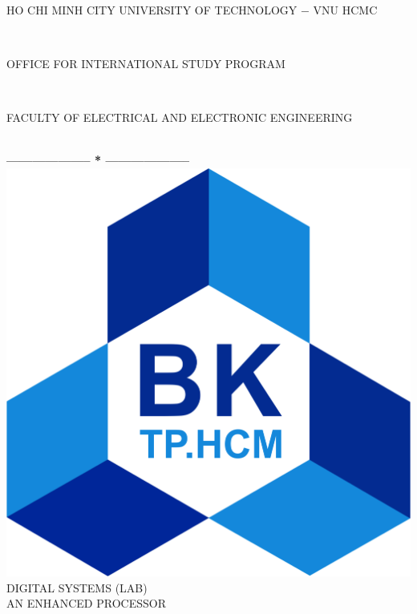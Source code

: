 \documentclass[13pt,a4paper]{report}
\begin{document}
\fontsize{13pt}{18pt}\selectfont
\begin{titlepage}
\thispagestyle{empty}
\thisfancypage{%
\setlength{\fboxsep}{0pt}%
\fbox}{} %
\

\begin{center}
\begin{large}
HO CHI MINH CITY UNIVERSITY OF TECHNOLOGY $-$ VNU HCMC
\end{large} \\
\begin{large}
OFFICE FOR INTERNATIONAL STUDY PROGRAM
\end{large} \\
\begin{large}
FACULTY OF ELECTRICAL AND ELECTRONIC ENGINEERING
\end{large} \\
\textbf{--------------------  *  --------------------}\\[4cm]
\includegraphics[scale=0.1]{logobk.png}\\[1cm]
{\fontsize{20pt}{1}\selectfont DIGITAL SYSTEMS (LAB)}\\
{\fontsize{20pt}{1}\selectfont AN ENHANCED PROCESSOR}\\[2.5cm]
\end{center}


\end{titlepage}
\end{document}
